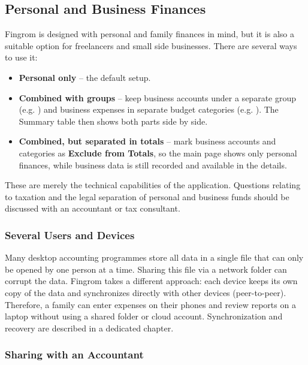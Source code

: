 \subsection{Personal and Business Finances}

Fingrom is designed with personal and family finances in mind, but it is also a suitable
option for freelancers and small side businesses. There are several ways to use it:

\begin{itemize}
  \item \textbf{Personal only} -- the default setup.
  \item \textbf{Combined with groups} -- keep business accounts under a separate group (e.g.
  ) and business expenses in separate budget categories
  (e.g. ). The Summary table then shows both parts side by side.
  \item \textbf{Combined, but separated in totals} -- mark business accounts and categories
  as \textbf{Exclude from Totals}, so the main page shows only personal finances, while
  business data is still recorded and available in the details.
\end{itemize}

\noindent These are merely the technical capabilities of the application. Questions relating
to taxation and the legal separation of personal and business funds should be discussed with
an accountant or tax consultant.

\subsubsection{Several Users and Devices}

Many desktop accounting programmes store all data in a single file that can only be opened by
one person at a time. Sharing this file via a network folder can corrupt the data. Fingrom
takes a different approach: each device keeps its own copy of the data and synchronizes
directly with other devices (peer-to-peer). Therefore, a family can enter expenses on their
phones and review reports on a laptop without using a shared folder or cloud account.
Synchronization and recovery are described in a dedicated chapter.


\subsubsection{Sharing with an Accountant}


